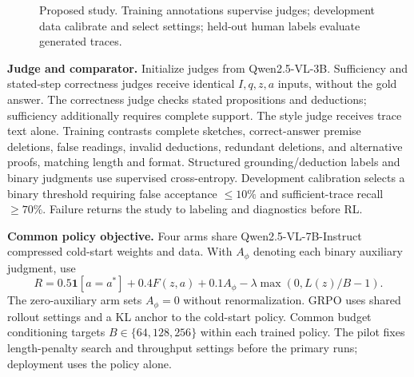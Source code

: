 \documentclass[11pt,letterpaper]{article}
\newcommand{\ind}{\mathbf{1}}
\begin{document}
\begin{figure}[ht]
\centering
{}
\caption{Proposed study. Training annotations supervise judges; development data calibrate and select settings; held-out human labels evaluate generated traces.}
\label{fig:pipeline}
\end{figure}

\textbf{Judge and comparator.} Initialize judges from Qwen2.5-VL-3B. Sufficiency and stated-step correctness judges receive identical $I,q,z,a$ inputs, without the gold answer. The correctness judge checks stated propositions and deductions; sufficiency additionally requires complete support. The style judge receives trace text alone. Training contrasts complete sketches, correct-answer premise deletions, false readings, invalid deductions, redundant deletions, and alternative proofs, matching length and format. Structured grounding/deduction labels and binary judgments use supervised cross-entropy. Development calibration selects a binary threshold requiring false acceptance $\leq10\%$ and sufficient-trace recall $\geq70\%$. Failure returns the study to labeling and diagnostics before RL.

\textbf{Common policy objective.} Four arms share Qwen2.5-VL-7B-Instruct compressed cold-start weights and data. With $A_\phi$ denoting each binary auxiliary judgment, use
\begin{equation}
R=0.5\ind[a=a^*]+0.4F(z,a)+0.1A_\phi-\lambda\max(0,L(z)/B-1).
\label{eq:reward}
\end{equation}
The zero-auxiliary arm sets $A_\phi=0$ without renormalization. GRPO uses shared rollout settings and a KL anchor to the cold-start policy. Common budget conditioning targets $B\in\{64,128,256\}$ within each trained policy. The pilot fixes length-penalty search and throughput settings before the primary runs; deployment uses the policy alone.
\end{document}
